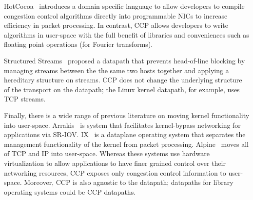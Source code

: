 HotCocoa~\cite{hotcocoa} introduces a domain specific language to allow developers to compile congestion control algorithms directly into programmable NICs to increase efficiency in packet processing. In contrast, CCP allows developers to write algorithms in user-space with the full benefit of libraries and conveniences such as  floating point operations (\eg for Fourier transforms). 

Structured Streams~\cite{structuredstreams} proposed a datapath that prevents head-of-line blocking by managing streams between the the same two hosts together and applying a hereditary structure on streams. CCP does not change the underlying structure of the transport on the datapath; the Linux kernel datapath, for example, uses TCP streams. 

Finally, there is a wide range of previous literature on moving kernel functionality into user-space. 
Arrakis~\cite{arrakis2014} is system that facilitates kernel-bypass networking for applications via SR-IOV. 
IX~\cite{ix} is a dataplane operating system that separates the management functionality of the kernel from packet processing. 
Alpine~\cite{alpine} moves all of TCP and IP into user-space.
Whereas these systems use hardware virtualization to allow applications to have finer grained control over their networking resources,
CCP exposes only congestion control information to user-space. 
Moreover, CCP is also agnostic to the datapath; datapaths for library operating systems could be CCP datapaths.